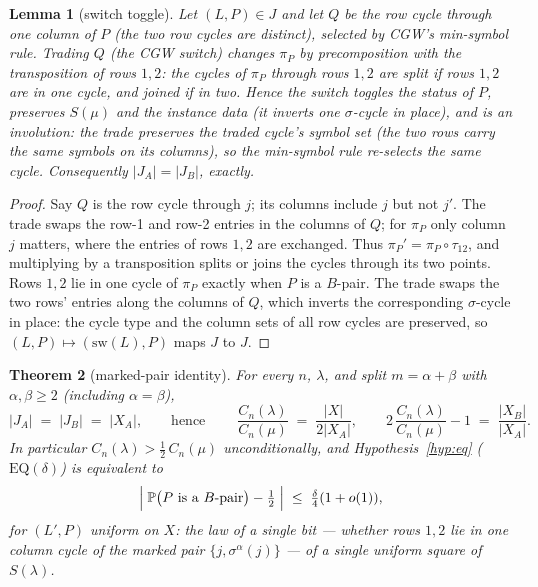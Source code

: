 \documentclass[11pt]{article}
\newtheorem{theorem}{Theorem}[section]
\newtheorem{lemma}[theorem]{Lemma}
\theoremstyle{definition}
\renewcommand{\Pr}{\mathbb{P}}
\newcommand{\CC}{C}
\begin{document}
\begin{lemma}[switch toggle]\label{lem:switchtoggle}
Let $(L,P)\in J$ and let $Q$ be the row cycle through one column of
$P$ (the two row cycles are distinct), selected by CGW's min-symbol rule.  Trading $Q$ (the CGW switch)
changes $\pi_P$ by precomposition with the transposition of rows
$1,2$: the cycles of $\pi_P$ through rows $1,2$ are split if rows
$1,2$ are in one cycle, and joined if in two.  Hence the switch
toggles the status of $P$, preserves $S(\mu)$ and the instance data
(it inverts one $\sigma$-cycle in place), and is an involution:
the trade preserves the traded cycle's symbol set (the two rows carry
the same symbols on its columns), so the min-symbol rule re-selects the
same cycle.  Consequently $|J_A|=|J_B|$, exactly.
\end{lemma}

\begin{proof}
Say $Q$ is the row cycle through $j$; its columns include $j$ but not
$j'$.  The trade swaps the row-1 and row-2 entries in the columns of
$Q$; for $\pi_P$ only column $j$ matters, where the entries of rows
$1,2$ are exchanged.  Thus $\pi_P'=\pi_P\circ\tau_{12}$, and
multiplying by a transposition splits or joins the cycles through its
two points.  Rows $1,2$ lie in one cycle of $\pi_P$ exactly when $P$
is a $B$-pair.  The trade swaps the two rows' entries along the
columns of $Q$, which inverts the corresponding $\sigma$-cycle in
place: the cycle type and the column sets of all row cycles are
preserved, so $(L,P)\mapsto(\mathrm{sw}(L),P)$ maps $J$ to $J$.
\end{proof}

\begin{theorem}[marked-pair identity]\label{thm:marked}
For every $n$, $\lambda$, and split $m=\alpha+\beta$ with
$\alpha,\beta\ge2$ (including $\alpha=\beta$),
\[
|J_A|\;=\;|J_B|\;=\;|X_A|,
\qquad\text{hence}\qquad
\boxed{\;\frac{\CC_n(\lambda)}{\CC_n(\mu)}\;=\;\frac{|X|}{2|X_A|},
\qquad
2\,\frac{\CC_n(\lambda)}{\CC_n(\mu)}-1\;=\;\frac{|X_B|}{|X_A|}.\;}
\]
In particular $\CC_n(\lambda)>\tfrac12\,\CC_n(\mu)$ unconditionally,
and Hypothesis~\ref{hyp:eq} ($\mathrm{EQ}(\delta)$) is equivalent to
\[
\Bigl|\;\Pr\bigl(P\text{ is a $B$-pair}\bigr)-\tfrac12\;\Bigr|
\;\le\;\tfrac{\delta}{4}(1+o(1)),
\]
for $(L',P)$ uniform on $X$: the law of a single bit --- whether rows
$1,2$ lie in one column cycle of the marked pair
$\{j,\sigma^\alpha(j)\}$ --- of a single uniform square of
$S(\lambda)$.
\end{theorem}
\end{document}
